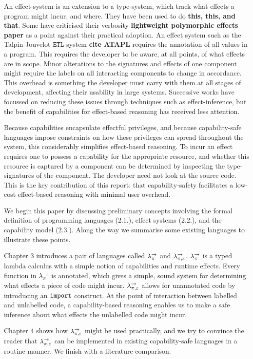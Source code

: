 An effect-system is an extension to a type-system, which track what effects a program might incur, and where. They have been used to do \textbf{this, this, and that}. Some have criticised their verbosity \textbf{lightweight polymorphic effects paper} as a point against their practical adoption. An effect system such as the Talpin-Jouvelot $\mathtt{ETL}$ system \textbf{cite ATAPL} requires the annotation of all values in a program. This requires the developer to be aware, at all points, of what effects are in scope. Minor alterations to the signatures and effects of one component might require the labels on all interacting components to change in accordance. This overhead is something the developer must carry with them at all stages of development, affecting their usability in large systems. Successive works have focussed on reducing these issues through techniques such as effect-inference, but the benefit of capabilities for effect-based reasoning has received less attention.

Because capabilities encapsulate effectful privileges, and because capability-safe languages impose constraints on how these privileges can spread throughout the system, this considerably simplifies effect-based reasoning. To incur an effect requires one to possess a capability for the appropriate resource, and whether this resource is captured by a component can be determined by inspecting the type-signatures of the component. The developer need not look at the source code. This is the key contribution of this report: that capability-safety facilitates a low-cost effect-based reasoning with minimal user overhead.

We begin this paper by discussing preliminary concepts involving the formal definition of programming languages (2.1.), effect systems (2.2.), and the capability model (2.3.). Along the way we summarise some existing languages to illustrate these points.

Chapter 3 introduces a pair of languages called $\lambda^{\rightarrow}_{\pi}$ and $\lambda^{\rightarrow}_{\pi, \varepsilon}$. $\lambda^{\rightarrow}_{\pi}$ is a typed lambda calculus with a simple notion of capabilities and runtime effects. Every function in $\lambda^{\rightarrow}_{\pi}$ is annotated, which gives a simple, sound system for determining what effects a piece of code might incur. $\lambda^{\rightarrow}_{\pi, \varepsilon}$ allows for unannotated code by introducing an $\mathtt{import}$ construct. At the point of interaction between labelled and unlabelled code, a capability-based reasoning enables us to make a safe inference about what effects the unlabelled code might incur.

Chapter 4 shows how $\lambda^{\rightarrow}_{\pi, \varepsilon}$ might be used practically, and we try to convince the reader that $\lambda^{\rightarrow}_{\pi, \varepsilon}$ can be implemented in existing capability-safe languages in a routine manner. We finish with a literature comparison.
